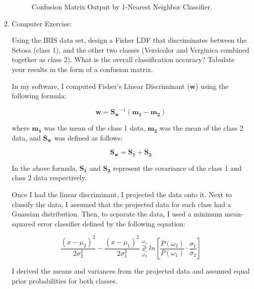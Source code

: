 \documentclass[fleqn]{article}
\begin{document}
\begin{enumerate}
		\begin{figure}[H]				
			\centerline{}
			\caption{Confusion Matrix Output by 1-Nearest Neighbor Classifier.}
			\label{1nn_confusion_matrix}
		\end{figure}
		
		\pagebreak
		
		\item Computer Exercise:
		
		Using the IRIS data set, design a Fisher LDF that discriminates between the Setosa (class 1), and the other two classes (Versicolor and Verginica combined together as class 2). What is the overall classification accuracy? Tabulate your results in the form of a confusion matrix.
		
		In my software, I computed Fisher's Linear Discriminant ($\mathbf{w}$) using the following formula:
		
		\begin{equation*}
			\mathbf{w} = \mathbf{S_w}^{-1}(\mathbf{m_1} - \mathbf{m_2})
		\end{equation*}
		
		where $\mathbf{m_1}$ was the mean of the class 1 data, $\mathbf{m_2}$ was the mean of the class 2 data, and $\mathbf{S_w}$ was defined as follows:
		
		\begin{equation*}
			\mathbf{S_w} = \mathbf{S_1} + \mathbf{S_2}
		\end{equation*}
		
		In the above formula, $\mathbf{S_1}$ and $\mathbf{S_2}$ represent the covariance of the class 1 and class 2 data respectively. 
		
		Once I had the linear discriminant, I projected the data onto it. Next to classify the data, I assumed that the projected data for each class had a Guassian distribution. Then, to separate the data, I used a minimum mean-squared error classifier defined by the following equation:
		
		\begin{equation*}
			\frac{(x - \mu_2)^2}{2\sigma_2^2} - \frac{(x - \mu_1)^2}{2\sigma_1^2} \overset{\omega_1}{\underset{\omega_2}{\gtrless}} ln\left[\frac{P(\omega_2)}{P(\omega_1)}\cdot\frac{\sigma_1}{\sigma_2}\right]
		\end{equation*}
		
		I derived the means and variances from the projected  data and assumed equal prior probabilities for both classes.
	\end{enumerate}
	
\end{document}

